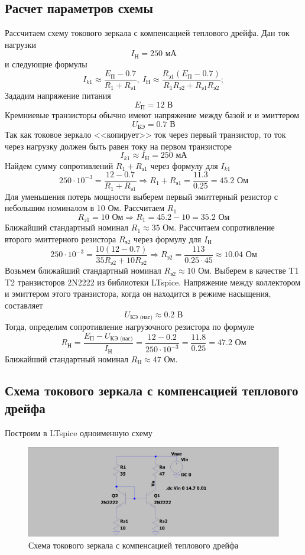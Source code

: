 \documentclass[a4paper, 12pt]{article}
\begin{document}
    \subsection{Расчет параметров схемы}
    Рассчитаем схему токового зеркала с компенсацией теплового дрейфа.
    Дан ток нагрузки $$I_\text{Н}=250\text{ мА}$$
    и следующие формулы
    $$
    I_{k1}\approx\dfrac{E_\text{П}-0.7}{R_1+R_\text{э1}},\ I_\text{Н}\approx\dfrac{R_\text{э1}\left( E_\text{П}-0.7 \right)}{R_1R_\text{э2}+R_\text{э1}R_\text{э2}};
    $$
    Зададим напряжение питания $$E_\text{П}=12\text{ В}$$
    Кремниевые транзисторы обычно имеют напряжение между базой и и эмиттером
    $$
    U_\text{БЭ}=0.7\text{ В}
    $$
    Так как токовое зеркало <<копирует>> ток через первый транзистор, то ток через
    нагрузку должен быть равен току на первом транзисторе
    $$
    I_{k1}\approx I_\text{Н}=250\text{ мА}
    $$
    Найдем сумму сопротивлений $R_1+R_\text{э1}$ через формулу для $I_{k1}$
    $$
    250\cdot10^{-3}=\dfrac{12-0.7}{R_1+R_\text{э1}}\Rightarrow R_1+R_\text{э1}=\dfrac{11.3}{0.25}=45.2\text{ Ом}
    $$
    Для уменьшения потерь мощности выберем первый эмиттерный резистор с небольшим номиналом в 10 Ом. Рассчитаем $R_1$
    $$
    R_\text{э1}=10\text{ Ом}\Rightarrow R_1=45.2-10=35.2\text{ Ом}
    $$
    Ближайший стандартный номинал $R_1\approx35$ Ом. Рассчитаем сопротивление второго эмиттерного резистора $R_\text{э2}$ через формулу для $I_\text{Н}$
    $$
    250\cdot10^{-3}=\dfrac{10\left( 12-0.7 \right)}{35R_\text{э2}+10R_\text{э2}}\Rightarrow R_\text{э2}=\dfrac{113}{0.25\cdot45}\approx10.04\text{ Ом}
    $$
    Возьмем ближайший стандартный номинал $R_\text{э2}\approx10$ Ом. Выберем в качестве T1 T2 транзисторов 2N2222 из библиотеки LTspice.
    Напряжение между коллектором и эмиттером этого транзистора, когда он находится в режиме насыщения, составляет
    $$
    U_\text{КЭ (нас)}\approx0.2\text{ В}
    $$
    Тогда, определим сопротивление нагрузочного резистора по формуле
    $$
    R_\text{Н}=\dfrac{E_\text{П}-U_\text{КЭ (нас)}}{I_\text{Н}}=\dfrac{12-0.2}{250\cdot10^{-3}}=\dfrac{11.8}{0.25}=47.2\text{ Ом}
    $$
    Ближайший стандартный номинал $R_\text{Н}\approx47$ Ом.


    \subsection{Схема токового зеркала с компенсацией теплового дрейфа}
    Построим в LTspice одноименную схему
    \begin{figure}[H]
        \centering
        \includegraphics[scale=0.22]{scheme1.png}
        \captionsetup{skip=0pt}
        \caption{Схема токового зеркала с компенсацией теплового дрейфа}
        \label{fig:scheme1}
    \end{figure}
\end{document}

